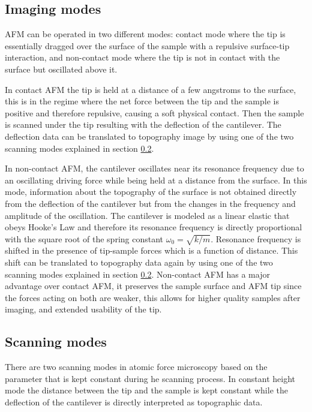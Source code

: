 \documentclass{article}
\begin{document}
\subsection{Imaging modes}
AFM can be operated in two different modes: contact mode where the tip is essentially dragged over the surface of the sample with a repulsive surface-tip interaction, and non-contact mode where the tip is not in contact with the surface but oscillated above it.

In contact AFM the tip is held at a distance of a few angstroms to the surface, this is in the regime where the net force between the tip and the sample is positive and therefore repulsive, causing a soft physical contact. Then the sample is scanned under the tip resulting with the deflection of the cantilever. The deflection data can be translated to topography image by using one of the two scanning modes explained in section \ref{sec:scanning_modes}.

In non-contact AFM, the cantilever oscillates near its resonance frequency due to an oscillating driving force while being held at a distance from the surface. In this mode, information about the topography of the surface is not obtained directly from the deflection of the cantilever but from the changes in the frequency and amplitude of the oscillation. The cantilever is modeled as a linear elastic that obeys Hooke's Law and therefore its resonance frequency is directly proportional with the square root of the spring constant $\omega_0 = \sqrt{k/m}$. Resonance frequency is shifted in the presence of tip-sample forces which is a function of distance. This shift can be translated to topography data again by using one of the two scanning modes explained in section \ref{sec:scanning_modes}. Non-contact AFM has a major advantage over contact AFM, it preserves the sample surface and AFM tip since the forces acting on both are weaker, this allows for higher quality samples after imaging, and extended usability of the tip.

\subsection{Scanning modes}
\label{sec:scanning_modes}
There are two scanning modes in atomic force microscopy based on the parameter that is kept constant during he scanning process. In constant height mode the distance between the tip and the sample is kept constant while the deflection of the cantilever is directly interpreted as topographic data. 
\end{document}

